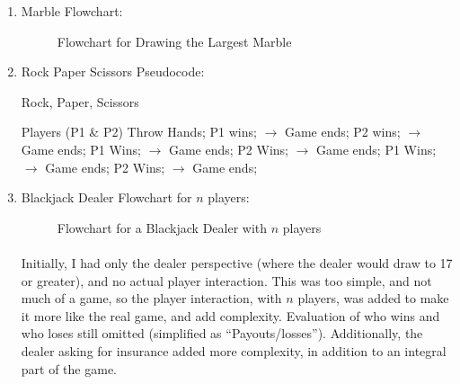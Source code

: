 \begin{enumerate}

    \newpage

  \item Marble Flowchart:

    \begin{figure}[H]
      \centering 
      \caption{Flowchart for Drawing the Largest Marble}
      \label{fig:1}
    \end{figure}

    \newpage

  \item Rock Paper Scissors Pseudocode:

    \begin{algorithm}
      \caption{Rock, Paper, Scissors}\label{RPS}
      \begin{algorithmic}[1]
        \State Players (P1 \& P2) Throw Hands;
             P1 wins; $\rightarrow$ Game ends;
             P2 wins; $\rightarrow$ Game ends;
        \EndIf
             P1 Wins; $\rightarrow$ Game ends;
             P2 Wins; $\rightarrow$ Game ends;
        \EndIf
        \Else
             P1 Wins; $\rightarrow$ Game ends;
             P2 Wins; $\rightarrow$ Game ends;
        \EndProcedure
      \end{algorithmic}
    \end{algorithm}

    \newpage

  \item Blackjack Dealer Flowchart for $n$ players:

    \begin{figure}[H]
      \centering 
      \caption{Flowchart for a Blackjack Dealer with $n$ players}
      \label{fig:1}
    \end{figure}

    \scriptsize \paragraph{} Initially, I had only the dealer perspective (where the dealer would draw to 17 or greater), and no actual player interaction. This was too simple, and not much of a game, so the player interaction, with $n$ players, was added to make it more like the real game, and add complexity. Evaluation of who wins and who loses still omitted (simplified as ``Payouts/losses''). Additionally, the dealer asking for insurance added more complexity, in addition to an integral part of the game.

\end{enumerate}



